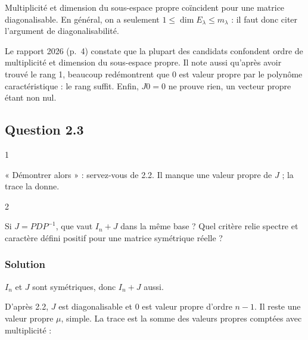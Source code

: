 \documentclass[11pt,a4paper]{article}
\begin{document}
\begin{methode}

Multiplicité et dimension du sous-espace propre coïncident pour une matrice diagonalisable. En général, on a seulement \(1\le\dim E_\lambda\le m_\lambda\) : il faut donc citer l'argument de diagonalisabilité.

\end{methode}

\begin{piege}

Le rapport 2026 (p.~4) constate que la plupart des candidats confondent ordre de multiplicité et dimension du sous-espace propre. Il note aussi qu'après avoir trouvé le rang 1, beaucoup redémontrent que \(0\) est valeur propre par le polynôme caractéristique : le rang suffit. Enfin, \(J0=0\) ne prouve rien, un vecteur propre étant non nul.

\end{piege}

\hypertarget{question-2.3}{%
\subsection{Question 2.3}\label{question-2.3}}

\begin{indication}{1}

« Démontrer alors » : servez-vous de 2.2. Il manque une valeur propre de \(J\) ; la trace la donne.

\end{indication}

\begin{indication}{2}

Si \(J=PDP^{-1}\), que vaut \(I_n+J\) dans la même base ? Quel critère relie spectre et caractère défini positif pour une matrice symétrique réelle ?

\end{indication}

\hypertarget{solution-3}{%
\subsubsection{Solution}\label{solution-3}}

\(I_n\) et \(J\) sont symétriques, donc \(I_n+J\) aussi.

D'après 2.2, \(J\) est diagonalisable et \(0\) est valeur propre d'ordre \(n-1\). Il reste une valeur propre \(\mu\), simple. La trace est la somme des valeurs propres comptées avec multiplicité :
\end{document}
